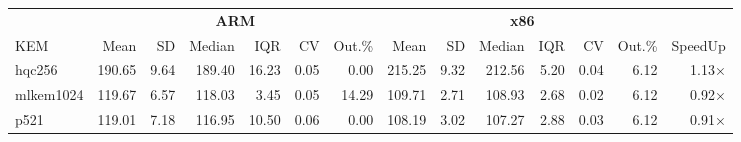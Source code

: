 \begin{table}[!ht]
\centering
\begin{tabular}{l|rrrrrr|rrrrrr|r}
\toprule
& \multicolumn{6}{c}{\bfseries ARM} & \multicolumn{6}{c}{\bfseries x86} & \\
\cmidrule(lr){2-7} \cmidrule(lr){8-13}
KEM & Mean & SD & Median & IQR & CV & Out.\% & Mean & SD & Median & IQR & CV & Out.\% & SpeedUp \\
\midrule
hqc256 & 190.65 & 9.64 & 189.40 & 16.23 & 0.05 & 0.00 & 215.25 & 9.32 & 212.56 & 5.20 & 0.04 & 6.12 & 1.13× \\
mlkem1024 & 119.67 & 6.57 & 118.03 & 3.45 & 0.05 & 14.29 & 109.71 & 2.71 & 108.93 & 2.68 & 0.02 & 6.12 & 0.92× \\
p521 & 119.01 & 7.18 & 116.95 & 10.50 & 0.06 & 0.00 & 108.19 & 3.02 & 107.27 & 2.88 & 0.03 & 6.12 & 0.91× \\
\bottomrule
\end{tabular}
\end{table}
